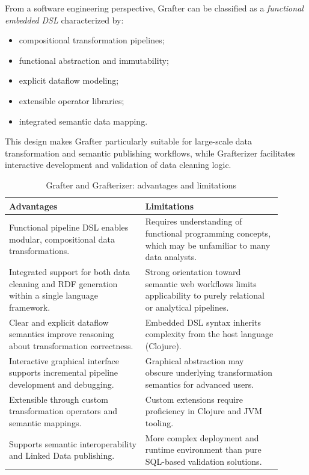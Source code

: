 From a software engineering perspective, Grafter can be classified as a \emph{functional embedded DSL} characterized by:
\begin{itemize}[label=-, noitemsep]
    \item compositional transformation pipelines;
    \item functional abstraction and immutability;
    \item explicit dataflow modeling;
    \item extensible operator libraries;
    \item integrated semantic data mapping.
\end{itemize}
This design makes Grafter particularly suitable for large-scale data transformation and semantic publishing workflows, while Grafterizer facilitates interactive development and validation of data cleaning logic.

\begin{table}[h]
\centering
\caption{Grafter and Grafterizer: advantages and limitations}
\begin{tabular}{|p{0.45\linewidth}| p{0.45\linewidth}|}
\hline
\textbf{Advantages} & \textbf{Limitations} \\
\hline
Functional pipeline DSL enables modular, compositional data transformations. &
Requires understanding of functional programming concepts, which may be unfamiliar to many data analysts. \\
\hline
Integrated support for both data cleaning and RDF generation within a single language framework. &
Strong orientation toward semantic web workflows limits applicability to purely relational or analytical pipelines. \\
\hline
Clear and explicit dataflow semantics improve reasoning about transformation correctness. &
Embedded DSL syntax inherits complexity from the host language (Clojure). \\
\hline
Interactive graphical interface supports incremental pipeline development and debugging. &
Graphical abstraction may obscure underlying transformation semantics for advanced users. \\
\hline
Extensible through custom transformation operators and semantic mappings. &
Custom extensions require proficiency in Clojure and JVM tooling. \\
\hline
Supports semantic interoperability and Linked Data publishing. &
More complex deployment and runtime environment than pure SQL-based validation solutions. \\
\hline
\end{tabular}
\end{table}







